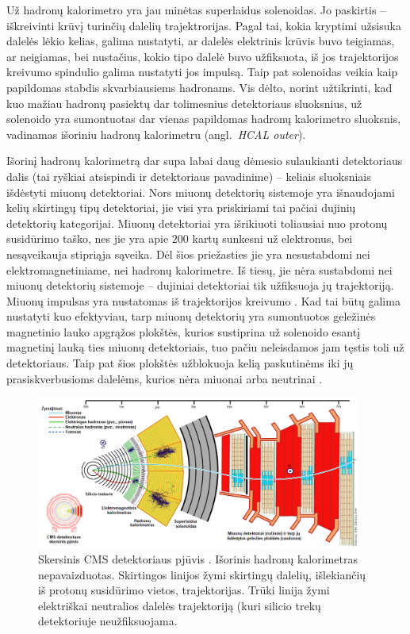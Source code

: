 \documentclass[a4paper, 12pt]{article}
\begin{document}
Už hadronų kalorimetro yra jau minėtas superlaidus solenoidas.
Jo paskirtis -- iškreivinti krūvį turinčių dalelių trajektrorijas.
Pagal tai, kokia kryptimi užsisuka dalelės lėkio kelias, galima nustatyti, ar dalelės elektrinis krūvis buvo
teigiamas, ar neigiamas, bei nustačius, kokio tipo dalelė buvo užfiksuota, iš jos trajektorijos kreivumo
spindulio galima nustatyti jos impulsą.
Taip pat solenoidas veikia kaip papildomas stabdis skvarbiausiems hadronams.
Vis dėlto, norint užtikrinti, kad kuo mažiau hadronų pasiektų dar tolimesnius detektoriaus sluoksnius, už
solenoido yra sumontuotas dar vienas papildomas hadronų kalorimetro sluoksnis, vadinamas išoriniu hadronų
kalorimetru (angl.\ \textit{HCAL outer}).

Išorinį hadronų kalorimetrą dar supa labai daug dėmesio sulaukianti detektoriaus dalis (tai ryškiai atsispindi
ir detektoriaus pavadinime) -- keliais sluoksniais išdėstyti miuonų detektoriai.
Nors miuonų detektorių sistemoje yra išnaudojami kelių skirtingų tipų detektoriai, jie visi yra priskiriami
tai pačiai dujinių detektorių kategorijai.
Miuonų detektoriai yra išrikiuoti toliausiai nuo protonų susidūrimo taško, nes jie yra apie $200$ kartų
sunkesni už elektronus, bei nesąveikauja stipriąja sąveika.
Dėl šios priežasties jie yra nesustabdomi nei elektromagnetiniame, nei hadronų kalorimetre.
Iš tiesų, jie nėra sustabdomi nei miuonų detektorių sistemoje -- dujiniai detektoriai tik užfiksuoja jų
trajektoriją.
Miuonų impulsas yra nustatomas iš trajektorijos kreivumo \cite{MuonChambers}.
Kad tai būtų galima nustatyti kuo efektyviau, tarp miuonų detektorių yra sumontuotos geležinės magnetinio
lauko apgrąžos plokštės, kurios sustiprina už solenoido esantį magnetinį lauką ties miuonų detektoriais,
tuo pačiu neleisdamos jam tęstis toli už detektoriaus.
Taip pat šios plokštės užblokuoja kelią paskutinėms iki jų prasiskverbusioms dalelėms, kurios nėra miuonai
arba neutrinai \cite{Solenoid}.

\begin{figure}[H] \centering
	\includegraphics[width=0.95\textwidth]{CMSslice_LT.png}
	\caption{\label{fig:CMSslice}Skersinis CMS detektoriaus pjūvis \cite{CMSslice}.
	Išorinis hadronų kalorimetras nepavaizduotas. Skirtingos linijos žymi skirtingų dalelių, išlekiančių
	iš protonų susidūrimo vietos, trajektorijas.
	Trūki linija žymi elektriškai neutralios dalelės trajektoriją (kuri silicio trekų detektoriuje
	neužfiksuojama.}
\end{figure}
\end{document}
